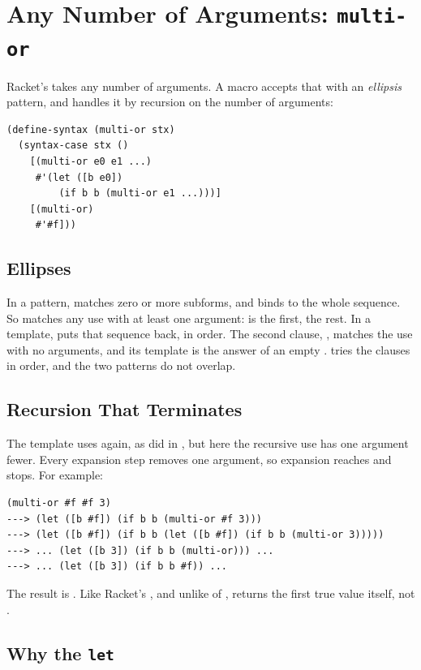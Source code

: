 \section{Any Number of Arguments: \texttt{multi-or}}
\label{sec:multior}

Racket's  takes any number of arguments. A macro accepts that with an \emph{ellipsis} pattern, and handles it by recursion on the number of arguments:
\begin{lstlisting}
(define-syntax (multi-or stx)
  (syntax-case stx ()
    [(multi-or e0 e1 ...)
     #'(let ([b e0])
         (if b b (multi-or e1 ...)))]
    [(multi-or)
     #'#f]))
\end{lstlisting}

\subsection{Ellipses}

In a pattern,  matches zero or more subforms, and binds  to the whole sequence. So  matches any use with at least one argument:  is the first,  the rest. In a template,  puts that sequence back, in order. The second clause, , matches the use with no arguments, and its template  is the answer of an empty .  tries the clauses in order, and the two patterns do not overlap.

\subsection{Recursion That Terminates}

The template uses  again, as  did in , but here the recursive use has one argument fewer. Every expansion step removes one argument, so expansion reaches  and stops. For example:
\begin{lstlisting}
(multi-or #f #f 3)
---> (let ([b #f]) (if b b (multi-or #f 3)))
---> (let ([b #f]) (if b b (let ([b #f]) (if b b (multi-or 3)))))
---> ... (let ([b 3]) (if b b (multi-or))) ...
---> ... (let ([b 3]) (if b b #f)) ...
\end{lstlisting}
The result is . Like Racket's , and unlike  of ,  returns the first true value itself, not .

\subsection{Why the \texttt{let}}

